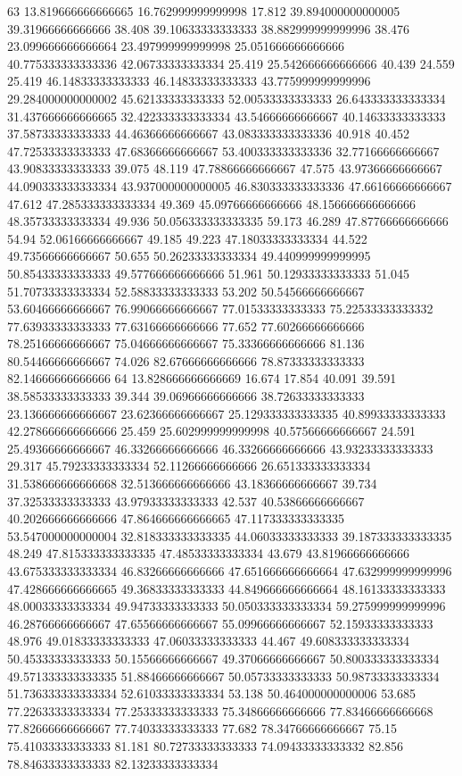 63 13.819666666666665 16.762999999999998 17.812 39.894000000000005 39.31966666666666 38.408 39.10633333333333 38.882999999999996 38.476 23.099666666666664 23.497999999999998 25.051666666666666 40.775333333333336 42.06733333333334 25.419 25.542666666666666 40.439 24.559 25.419 46.14833333333333 46.14833333333333 43.775999999999996 29.284000000000002 45.62133333333333 52.00533333333333 26.643333333333334 31.437666666666665 32.422333333333334 43.54666666666667 40.14633333333333 37.58733333333333 44.46366666666667 43.083333333333336 40.918 40.452 47.72533333333333 47.68366666666667 53.400333333333336 32.77166666666667 43.90833333333333 39.075 48.119 47.78866666666667 47.575 43.97366666666667 44.090333333333334 43.937000000000005 46.830333333333336 47.66166666666667 47.612 47.285333333333334 49.369 45.09766666666666 48.156666666666666 48.35733333333334 49.936 50.056333333333335 59.173 46.289 47.87766666666666 54.94 52.06166666666667 49.185 49.223 47.18033333333334 44.522 49.73566666666667 50.655 50.26233333333334 49.440999999999995 50.85433333333333 49.577666666666666 51.961 50.12933333333333 51.045 51.70733333333334 52.58833333333333 53.202 50.54566666666667 53.60466666666667 76.99066666666667 77.01533333333333 75.22533333333332 77.63933333333333 77.63166666666666 77.652 77.60266666666666 78.25166666666667 75.04666666666667 75.33366666666666 81.136 80.54466666666667 74.026 82.67666666666666 78.87333333333333 82.14666666666666
64 13.828666666666669 16.674 17.854 40.091 39.591 38.58533333333333 39.344 39.06966666666666 38.72633333333333 23.136666666666667 23.62366666666667 25.129333333333335 40.89933333333333 42.278666666666666 25.459 25.602999999999998 40.57566666666667 24.591 25.49366666666667 46.33266666666666 46.33266666666666 43.93233333333333 29.317 45.79233333333334 52.11266666666666 26.651333333333334 31.538666666666668 32.513666666666666 43.18366666666667 39.734 37.32533333333333 43.97933333333333 42.537 40.53866666666667 40.202666666666666 47.864666666666665 47.117333333333335 53.547000000000004 32.818333333333335 44.06033333333333 39.187333333333335 48.249 47.815333333333335 47.48533333333334 43.679 43.81966666666666 43.675333333333334 46.83266666666666 47.651666666666664 47.632999999999996 47.428666666666665 49.36833333333333 44.849666666666664 48.16133333333333 48.00033333333334 49.94733333333333 50.050333333333334 59.275999999999996 46.28766666666667 47.65566666666667 55.09966666666667 52.15933333333333 48.976 49.01833333333333 47.06033333333333 44.467 49.608333333333334 50.45333333333333 50.15566666666667 49.37066666666667 50.800333333333334 49.571333333333335 51.88466666666667 50.05733333333333 50.98733333333334 51.736333333333334 52.61033333333334 53.138 50.464000000000006 53.685 77.22633333333334 77.25333333333333 75.34866666666666 77.83466666666668 77.82666666666667 77.74033333333333 77.682 78.34766666666667 75.15 75.41033333333333 81.181 80.72733333333333 74.09433333333332 82.856 78.84633333333333 82.13233333333334
